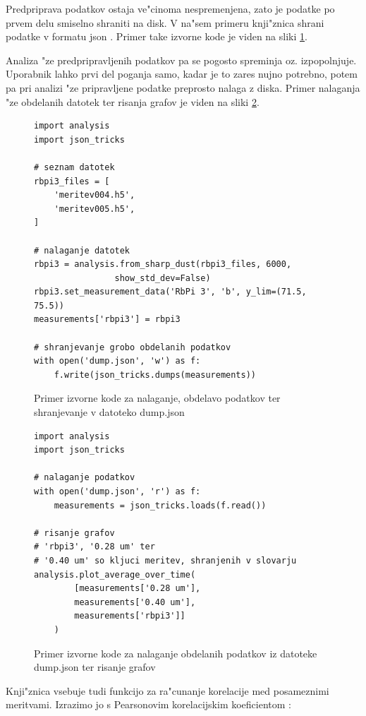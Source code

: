 \documentclass[12pt,a4paper]{article}
\begin{document}
Predpriprava podatkov ostaja ve"cinoma nespremenjena, zato je podatke po prvem delu smiselno shraniti na disk. V na"sem primeru knji"znica shrani podatke v formatu json \cite{json}. Primer take izvorne kode je viden na sliki \ref{dump-data}.

Analiza "ze predpripravljenih podatkov pa se pogosto spreminja oz. izpopolnjuje. Uporabnik lahko prvi del poganja samo, kadar je to zares nujno potrebno, potem pa pri analizi "ze pripravljene podatke preprosto nalaga z diska. Primer nalaganja "ze obdelanih datotek ter risanja grafov je viden na sliki \ref{plot-data}.

\begin{figure}[H]
	\begin{lstlisting}[frame=single]
import analysis
import json_tricks

# seznam datotek
rbpi3_files = [
	'meritev004.h5',
	'meritev005.h5',
]

# nalaganje datotek
rbpi3 = analysis.from_sharp_dust(rbpi3_files, 6000,
				show_std_dev=False)
rbpi3.set_measurement_data('RbPi 3', 'b', y_lim=(71.5, 75.5))
measurements['rbpi3'] = rbpi3

# shranjevanje grobo obdelanih podatkov
with open('dump.json', 'w') as f:
	f.write(json_tricks.dumps(measurements))
	\end{lstlisting}
	\caption{Primer izvorne kode za nalaganje, obdelavo podatkov ter shranjevanje v datoteko dump.json}
	\label{dump-data}
\end{figure}

\begin{figure}[H]
	\begin{lstlisting}[frame=single]
import analysis
import json_tricks

# nalaganje podatkov
with open('dump.json', 'r') as f:
	measurements = json_tricks.loads(f.read())

# risanje grafov
# 'rbpi3', '0.28 um' ter
# '0.40 um' so kljuci meritev, shranjenih v slovarju
analysis.plot_average_over_time(
		[measurements['0.28 um'],
		measurements['0.40 um'],
		measurements['rbpi3']]
	)

	\end{lstlisting}
	\caption{Primer izvorne kode za nalaganje obdelanih podatkov iz datoteke dump.json ter risanje grafov}
	\label{plot-data}
\end{figure}

Knji"znica vsebuje tudi funkcijo za ra"cunanje korelacije med posameznimi meritvami. Izrazimo jo s Pearsonovim korelacijskim koeficientom \cite{correlation}:
\end{document}
